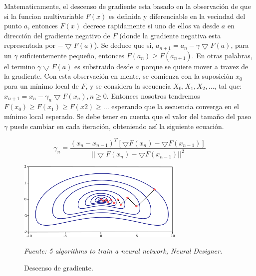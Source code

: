 Matematicamente, el descenso de gradiente esta basado en la observación de que si la funcion multivariable $F(x)$ es definida y  diferenciable en la vecindad del punto $a$, entonces $F(x)$ decrece rapidamente si uno de ellos va desde $a$ en dirección del gradiente negativo de $F$ (donde la gradiente negativa esta representada por $-\bigtriangledown F(a)$). Se deduce que si, $a_{n+1} = a_n - \gamma \bigtriangledown F(a)$, para un $\gamma$ suficientemente pequeño, entonces $F(a_n)\geq F(a_{n+1})$. En otras palabras, el termino $\gamma \bigtriangledown F(a)$ es substraido desde $a$ porque se quiere mover a travez de la gradiente.  Con esta observación en mente,  se comienza con la suposición $x_0$ para un mínimo local de $F$, y se considera la secuencia $X_0, X_1, X_2,...$, tal que: $x_{n+1} = x_n - \gamma_n \bigtriangledown F(x_n), n\geq0$. Entonces nosotros tendremos $F(x_0)\geq F(x_1) \geq F(x2) \geq ...$ esperando que la secuencia converga en el mínimo local esperado. Se debe tener en cuenta que el valor del tamaño del paso $\gamma$ puede cambiar en cada iteración, obteniendo así la siguiente ecuación.

\begin{equation}
\gamma_n=\frac{(x_n - x_{n-1})^T [\bigtriangledown F(x_n)-\bigtriangledown F(x_{n-1})]}{||\bigtriangledown F(x_n)-\bigtriangledown F(x_{n-1})||^2}
\end{equation}
\begin{figure}[H]
		\centering
		\includegraphics[width=80mm]{Imagenes/back_propagation.png}
		\caption{Descenso de gradiente.}
		\vspace{0.15cm}
		\textit{Fuente: 5 algorithms to train a neural network, Neural Designer.}
		\label{fig:back_propagation}
\end{figure}


